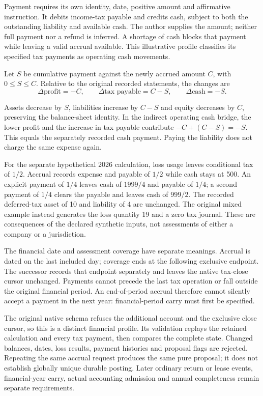 Payment requires its own identity, date, positive amount and affirmative
instruction. It debits income-tax payable and credits cash, subject to both the
outstanding liability and available cash. The author supplies the amount;
neither full payment nor a refund is inferred. A shortage of cash blocks that
payment while leaving a valid accrual available. This illustrative profile
classifies its specified tax payments as operating cash movements.

\begin{samepage}
Let $S$ be cumulative payment against the newly accrued amount $C$, with
$0\leq S\leq C$. Relative to the original recorded statements, the changes are
\[
 \Delta\text{profit}=-C,\qquad
 \Delta\text{tax payable}=C-S,\qquad
 \Delta\text{cash}=-S.
\]
\end{samepage}
Assets decrease by $S$, liabilities increase by $C-S$ and equity decreases by
$C$, preserving the balance-sheet identity. In the indirect operating cash
bridge, the lower profit and the increase in tax payable contribute
$-C+(C-S)=-S$. This equals the separately recorded cash payment. Paying the
liability does not charge the same expense again.

For the separate hypothetical 2026 calculation, loss usage leaves conditional
tax of $1/2$. Accrual records expense and payable of $1/2$ while cash stays at
500. An explicit payment of $1/4$ leaves cash of $1999/4$ and payable of $1/4$;
a second payment of $1/4$ clears the payable and leaves cash of $999/2$.
The recorded deferred-tax asset of 10 and liability of 4 are unchanged.
The original mixed example instead generates the loss quantity 19 and a zero
tax journal. These are consequences of the declared synthetic inputs, not
assessments of either a company or a jurisdiction.

The financial date and assessment coverage have separate meanings. Accrual is
dated on the last included day; coverage ends at the following exclusive
endpoint. The successor records that endpoint separately and leaves the native
tax-close cursor unchanged. Payments cannot precede the last tax operation or
fall outside the original financial period. An end-of-period accrual therefore
cannot silently accept a payment in the next year: financial-period carry must
first be specified.

The original native schema refuses the additional account and the exclusive
close cursor, so this is a distinct financial profile. Its validation replays
the retained calculation and every tax payment, then compares the complete
state. Changed balances, dates, loss results, payment histories and proposal
flags are rejected. Repeating the same accrual request produces the same pure
proposal; it does not establish globally unique durable posting. Later ordinary
return or lease events, financial-year carry, actual accounting admission and
annual completeness remain separate requirements.

